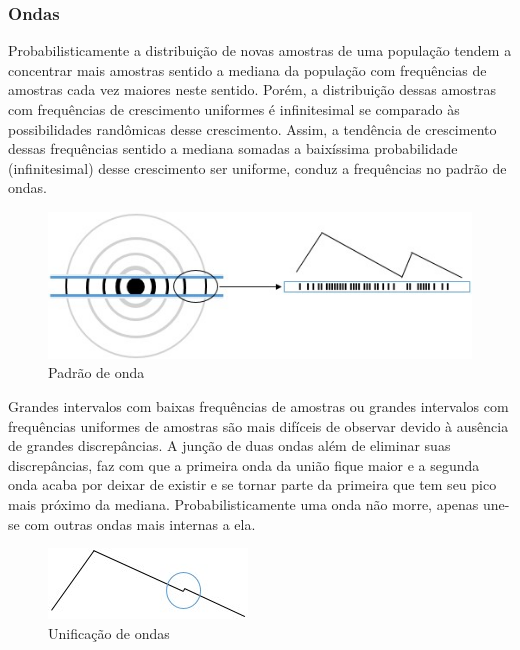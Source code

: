 \subsubsection{Ondas}
Probabilisticamente a distribuição de novas amostras de uma população tendem a concentrar mais amostras sentido a mediana da população com frequências de amostras cada vez maiores neste sentido. Porém, a distribuição dessas amostras com frequências de crescimento uniformes é infinitesimal se comparado às possibilidades randômicas desse crescimento. Assim, a tendência de crescimento dessas frequências sentido a mediana somadas a baixíssima probabilidade (infinitesimal) desse crescimento ser uniforme, conduz a frequências no padrão de ondas.
\begin{figure}[H]
\caption{Padrão de onda}
\label{fig:consciousness_waves}
\centering
\includegraphics[scale=1]{sections/images/consciousness_waves.jpg}
\end{figure}

Grandes intervalos com baixas frequências de amostras ou grandes intervalos com frequências uniformes de amostras são mais difíceis de observar devido à ausência de grandes discrepâncias. A junção de duas ondas além de eliminar suas discrepâncias, faz com que a primeira onda da união fique maior e a segunda onda acaba por deixar de existir e se tornar parte da primeira que tem seu pico mais próximo da mediana. Probabilisticamente uma onda não morre, apenas une-se com outras ondas mais internas a ela.
\begin{figure}[H]
\caption{Unificação de ondas}
\label{fig:consciousness_uniform_wave}
\centering
\includegraphics[scale=1]{sections/images/consciousness_uniform_wave.jpg}
\end{figure}


